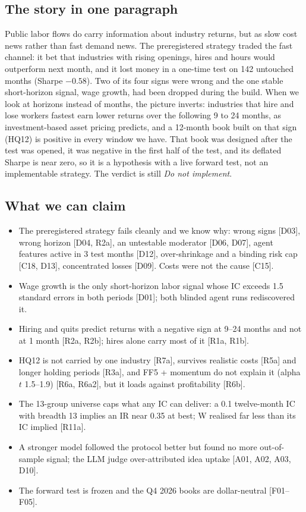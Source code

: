 \subsection*{The story in one paragraph}
Public labor flows do carry information about industry returns, but as slow cost news rather than fast demand news. The preregistered strategy traded the fast channel: it bet that industries with rising openings, hires and hours would outperform next month, and it lost money in a one-time test on 142 untouched months (Sharpe $-0.58$). Two of its four signs were wrong and the one stable short-horizon signal, wage growth, had been dropped during the build. When we look at horizons instead of months, the picture inverts: industries that hire and lose workers fastest earn lower returns over the following 9 to 24 months, as investment-based asset pricing predicts, and a 12-month book built on that sign (HQ12) is positive in every window we have. That book was designed after the test was opened, it was negative in the first half of the test, and its deflated Sharpe is near zero, so it is a hypothesis with a live forward test, not an implementable strategy. The verdict is still \emph{Do not implement}.

\subsection*{What we can claim}
\begin{itemize}
\item The preregistered strategy fails cleanly and we know why: wrong signs [D03], wrong horizon [D04, R2a], an untestable moderator [D06, D07], agent features active in 3 test months [D12], over-shrinkage and a binding risk cap [C18, D13], concentrated losses [D09]. Costs were not the cause [C15].
\item Wage growth is the only short-horizon labor signal whose IC exceeds 1.5 standard errors in both periods [D01]; both blinded agent runs rediscovered it.
\item Hiring and quits predict returns with a negative sign at 9--24 months and not at 1 month [R2a, R2b]; hires alone carry most of it [R1a, R1b].
\item HQ12 is not carried by one industry [R7a], survives realistic costs [R5a] and longer holding periods [R3a], and FF5 + momentum do not explain it (alpha $t$ 1.5--1.9) [R6a, R6a2], but it loads against profitability [R6b].
\item The 13-group universe caps what any IC can deliver: a 0.1 twelve-month IC with breadth 13 implies an IR near 0.35 at best; W realised far less than its IC implied [R11a].
\item A stronger model followed the protocol better but found no more out-of-sample signal; the LLM judge over-attributed idea uptake [A01, A02, A03, D10].
\item The forward test is frozen and the Q4 2026 books are dollar-neutral [F01--F05].
\end{itemize}

